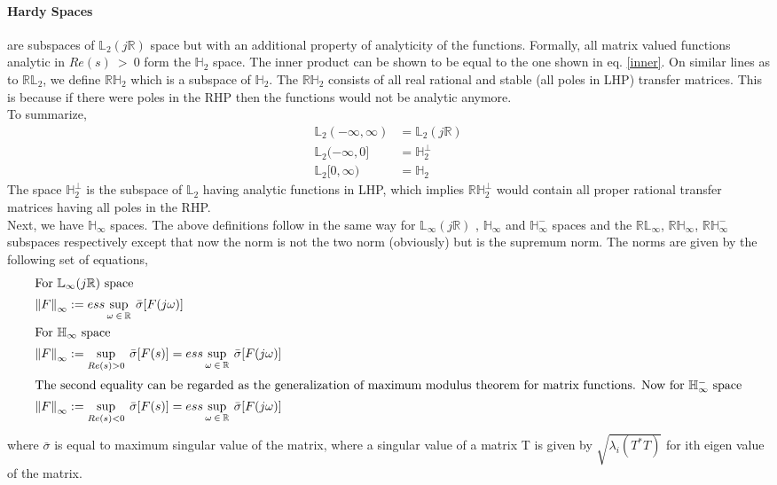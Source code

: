 \documentclass[a4paper,12pt]{article}
\newcommand\norm[1]{\left\lVert#1\right\rVert}
\begin{document}
		\paragraph{Hardy Spaces} \label{hinfnorm} are subspaces of $\mathbb{L}_{2}(j\mathbb{R})$ space but with an additional property of analyticity of the functions. Formally, all matrix valued functions analytic in $Re(s)\: > \:0$ form the $\mathbb{H}_{2}$ space. The inner product can be shown to be equal to the one shown in eq. \ref{inner}. On similar lines as to  $\mathbb{RL}_{2}$, we define  $\mathbb{RH}_{2}$ which is a subspace of $\mathbb{H}_{2}$. The $\mathbb{RH}_{2}$ consists of all real rational and stable (all poles in LHP) transfer matrices. This is because if there were poles in the RHP then the functions would not be analytic anymore.\\ To summarize,
		\begin{align*}
		 	\mathbb{L}_{2}(-\infty,\infty) &= \mathbb{L}_{2}(j\mathbb{R}) \\
		 	\mathbb{L}_{2}(-\infty,0] &= \mathbb{H}_{2}^{\perp} \\
		 	\mathbb{L}_{2}[0,\infty) &= \mathbb{H}_{2}
		 \end{align*}
		 The space $\mathbb{H}_{2}^{\perp}$ is the subspace of $\mathbb{L}_{2}$ having analytic functions in LHP, which implies  $\mathbb{RH}_{2}^{\perp}$ would contain all proper rational transfer matrices having all poles in the RHP.
		\\Next, we have  $\mathbb{H}_{\infty}$ spaces. The above definitions follow in the same way for $\mathbb{L}_{\infty}(j\mathbb{R})$ , $\mathbb{H}_{\infty}$ and $\mathbb{H}_{\infty}^{-}$ spaces and the $\mathbb{RL}_{\infty}$, $\mathbb{RH}_{\infty}$, $\mathbb{RH}_{\infty}^{-}$ subspaces respectively except that now the norm is not the two norm (obviously) but is the supremum norm. The norms are given by the following set of equations,
		\begin{align}
		\intertext{For $\mathbb{L}_{\infty}(j\mathbb{R})$ space}
		\norm{F}_{\infty} &:= ess \sup_{\omega\:\in\:\mathbb{R}} \: \bar{\sigma} [F(j\omega)] \\
		\intertext{For $\mathbb{H}_{\infty}$ space}
		\norm{F}_{\infty} &:= \sup_{Re(s) > 0} \: \bar{\sigma} [F(s)] = ess \sup_{\omega\:\in\:\mathbb{R}} \: \bar{\sigma} [F(j\omega)] \\
		\intertext{The second equality can be regarded as the generalization of maximum modulus theorem for matrix functions. Now for $\mathbb{H}_{\infty}^{-}$ space}
		\norm{F}_{\infty} &:= \sup_{Re(s) < 0} \: \bar{\sigma} [F(s)] = ess \sup_{\omega\:\in\:\mathbb{R}} \: \bar{\sigma} [F(j\omega)]
		\end{align}
		where $\bar{\sigma}$ is equal to maximum singular value of the matrix, where a singular value of a matrix T is given by $\sqrt{\lambda_{i}(T^{*}T)}$ for ith eigen value of the matrix.
\end{document}
